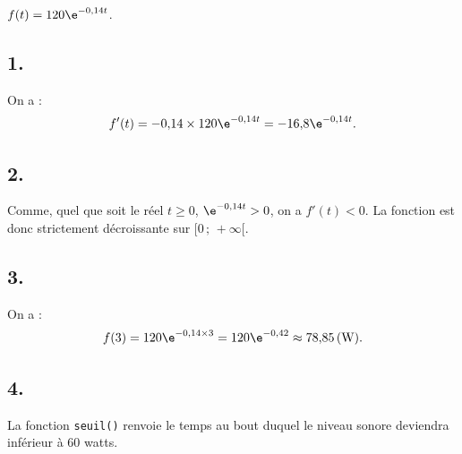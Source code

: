 \( f(t) = 120 \e^{-0{,}14t} \).

\subsection*{1.}

On a :
\[
f'(t) = -0{,}14 \times 120 \e^{-0{,}14t} = -16{,}8 \e^{-0{,}14t}.
\]

\subsection*{2.}

Comme, quel que soit le réel \(t \geqslant 0\), \(\e^{-0{,}14t} > 0\), on a \(f'(t) < 0\). La fonction est donc strictement décroissante sur \([0 \,;\, +\infty [\).

\subsection*{3.}

On a :
\[
f(3) = 120 \e^{-0{,}14 \times 3} = 120 \e^{-0{,}42} \approx 78{,}85 \, \text{(W)}.
\]

\subsection*{4.}

La fonction \texttt{seuil()} renvoie le temps au bout duquel le niveau sonore deviendra inférieur à 60 watts.

